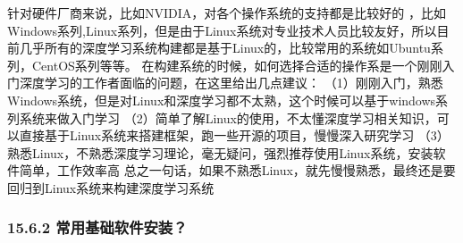 针对硬件厂商来说，比如NVIDIA，对各个操作系统的支持都是比较好的
，比如Windows系列,Linux系列，但是由于Linux系统对专业技术人员比较友好，所以目前几乎所有的深度学习系统构建都是基于Linux的，比较常用的系统如Ubuntu系列，CentOS系列等等。
在构建系统的时候，如何选择合适的操作系是一个刚刚入门深度学习的工作者面临的问题，在这里给出几点建议：
（1）刚刚入门，熟悉Windows系统，但是对Linux和深度学习都不太熟，这个时候可以基于windows系列系统来做入门学习
（2）简单了解Linux的使用，不太懂深度学习相关知识，可以直接基于Linux系统来搭建框架，跑一些开源的项目，慢慢深入研究学习
（3）熟悉Linux，不熟悉深度学习理论，毫无疑问，强烈推荐使用Linux系统，安装软件简单，工作效率高
总之一句话，如果不熟悉Linux，就先慢慢熟悉，最终还是要回归到Linux系统来构建深度学习系统

\subsubsection{15.6.2
常用基础软件安装？}\label{ux5e38ux7528ux57faux7840ux8f6fux4ef6ux5b89ux88c5}

